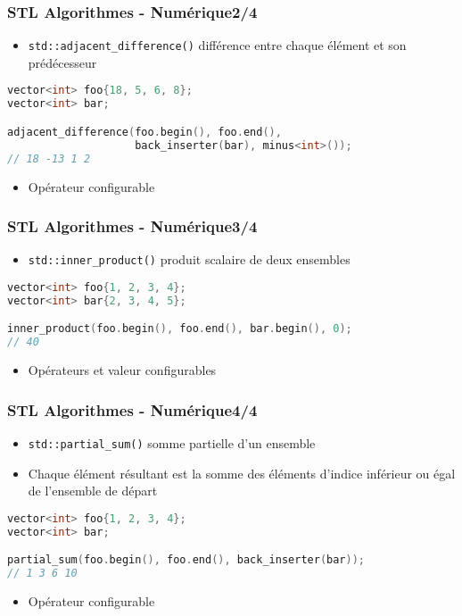 \documentclass[C++.tex]{subfiles}
\begin{document}
\begin{frame}[fragile]
	\frametitle{STL Algorithmes - Numérique\titlehfill{}2/4}
	\begin{itemize}
		\item \lstinline|std::adjacent_difference()| \og différence\fg{} entre chaque élément et son prédécesseur
	\end{itemize}

	\begin{lstlisting}[language=C++]
vector<int> foo{18, 5, 6, 8};
vector<int> bar;

adjacent_difference(foo.begin(), foo.end(), 
                    back_inserter(bar), minus<int>());
// 18 -13 1 2\end{lstlisting}

	\begin{itemize}
		\item Opérateur configurable
	\end{itemize}
\end{frame}

\begin{frame}[fragile]
	\frametitle{STL Algorithmes - Numérique\titlehfill{}3/4}
	\begin{itemize}
		\item \lstinline|std::inner_product()| \og produit scalaire\fg{} de deux ensembles
	\end{itemize}

	\begin{lstlisting}[language=C++]
vector<int> foo{1, 2, 3, 4};
vector<int> bar{2, 3, 4, 5};

inner_product(foo.begin(), foo.end(), bar.begin(), 0);
// 40\end{lstlisting}

	\begin{itemize}
		\item Opérateurs et valeur configurables
	\end{itemize}
\end{frame}

\begin{frame}[fragile]
	\frametitle{STL Algorithmes - Numérique\titlehfill{}4/4}
	\begin{itemize}
		\item \lstinline|std::partial_sum()| \og somme\fg{} partielle d'un ensemble
		\item Chaque élément résultant est la somme des éléments d'indice inférieur ou égal de l'ensemble de départ
	\end{itemize}

	\begin{lstlisting}[language=C++]
vector<int> foo{1, 2, 3, 4};
vector<int> bar;

partial_sum(foo.begin(), foo.end(), back_inserter(bar));
// 1 3 6 10\end{lstlisting}

	\begin{itemize}
		\item Opérateur configurable
	\end{itemize}
\end{frame}
\end{document}
